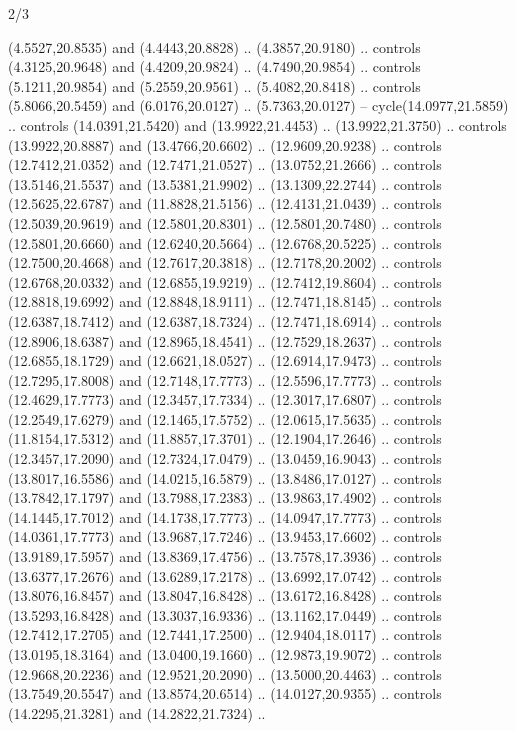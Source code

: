 \begin{flagdescription}{2/3}
\begin{scope}[yshift=\flagwidth,scale=\flagwidth/1241.93737]
\begin{scope}[y=-1mm, x=1mm,draw=gold,fill=blue,line join=miter,miter limit=4,line width=1.8\lw]
{  (4.5527,20.8535) and (4.4443,20.8828) .. (4.3857,20.9180) .. controls
  (4.3125,20.9648) and (4.4209,20.9824) .. (4.7490,20.9854) .. controls
  (5.1211,20.9854) and (5.2559,20.9561) .. (5.4082,20.8418) .. controls
  (5.8066,20.5459) and (6.0176,20.0127) .. (5.7363,20.0127) --
  cycle(14.0977,21.5859) .. controls (14.0391,21.5420) and (13.9922,21.4453) ..
  (13.9922,21.3750) .. controls (13.9922,20.8887) and (13.4766,20.6602) ..
  (12.9609,20.9238) .. controls (12.7412,21.0352) and (12.7471,21.0527) ..
  (13.0752,21.2666) .. controls (13.5146,21.5537) and (13.5381,21.9902) ..
  (13.1309,22.2744) .. controls (12.5625,22.6787) and (11.8828,21.5156) ..
  (12.4131,21.0439) .. controls (12.5039,20.9619) and (12.5801,20.8301) ..
  (12.5801,20.7480) .. controls (12.5801,20.6660) and (12.6240,20.5664) ..
  (12.6768,20.5225) .. controls (12.7500,20.4668) and (12.7617,20.3818) ..
  (12.7178,20.2002) .. controls (12.6768,20.0332) and (12.6855,19.9219) ..
  (12.7412,19.8604) .. controls (12.8818,19.6992) and (12.8848,18.9111) ..
  (12.7471,18.8145) .. controls (12.6387,18.7412) and (12.6387,18.7324) ..
  (12.7471,18.6914) .. controls (12.8906,18.6387) and (12.8965,18.4541) ..
  (12.7529,18.2637) .. controls (12.6855,18.1729) and (12.6621,18.0527) ..
  (12.6914,17.9473) .. controls (12.7295,17.8008) and (12.7148,17.7773) ..
  (12.5596,17.7773) .. controls (12.4629,17.7773) and (12.3457,17.7334) ..
  (12.3017,17.6807) .. controls (12.2549,17.6279) and (12.1465,17.5752) ..
  (12.0615,17.5635) .. controls (11.8154,17.5312) and (11.8857,17.3701) ..
  (12.1904,17.2646) .. controls (12.3457,17.2090) and (12.7324,17.0479) ..
  (13.0459,16.9043) .. controls (13.8017,16.5586) and (14.0215,16.5879) ..
  (13.8486,17.0127) .. controls (13.7842,17.1797) and (13.7988,17.2383) ..
  (13.9863,17.4902) .. controls (14.1445,17.7012) and (14.1738,17.7773) ..
  (14.0947,17.7773) .. controls (14.0361,17.7773) and (13.9687,17.7246) ..
  (13.9453,17.6602) .. controls (13.9189,17.5957) and (13.8369,17.4756) ..
  (13.7578,17.3936) .. controls (13.6377,17.2676) and (13.6289,17.2178) ..
  (13.6992,17.0742) .. controls (13.8076,16.8457) and (13.8047,16.8428) ..
  (13.6172,16.8428) .. controls (13.5293,16.8428) and (13.3037,16.9336) ..
  (13.1162,17.0449) .. controls (12.7412,17.2705) and (12.7441,17.2500) ..
  (12.9404,18.0117) .. controls (13.0195,18.3164) and (13.0400,19.1660) ..
  (12.9873,19.9072) .. controls (12.9668,20.2236) and (12.9521,20.2090) ..
  (13.5000,20.4463) .. controls (13.7549,20.5547) and (13.8574,20.6514) ..
  (14.0127,20.9355) .. controls (14.2295,21.3281) and (14.2822,21.7324) ..
}
\end{scope}
\end{scope}
\end{flagdescription}
